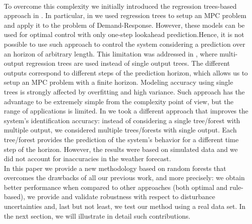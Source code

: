 {\\
To overcome this complexity we initially introduced the regression trees-based approach in \cite{Behl2016,Jain2017TCPS}. In particular, in \cite{Behl2016} we used regression trees to setup an MPC problem and apply it to the problem of Demand-Response. However, these models can be used for optimal control with only one-step lookahead prediction.Hence, it is not possible to use such approach to control the system considering a prediction over an horizon of arbitrary length. This limitation was addressed in \cite{Jain2017TCPS}, where multi-output regression trees are used instead of single output trees. The different outputs correspond to different steps of the prediction horizon, which allows us to setup an MPC problem with a finite horizon. Modeling accuracy using single trees is strongly affected by overfitting and high variance. Such approach has the advantage to be extremely simple from the complexity point of view, but the range of applications is limited. In \cite{JainACC2017,JainCDC2017} we took a different approach that improves the system's identification accuracy: instead of considering a single tree/forest with multiple output, we considered multiple trees/forests with single output. Each tree/forest provides the prediction of the system's behavior for a different time step of the horizon. However, the results were based on simulated data and we did not account for inaccuracies in the weather forecast.\\
In this paper we provide a new methodology based on random forests that overcomes the drawbacks of all our previous work, and more precisely: we obtain better performance when compared to other approaches (both optimal and rule-based), we provide and validate robustness with respect to disturbance uncertainties and, last but not least, we test our method using a real data set. In the next section, we will illustrate in detail such contributions.
}






